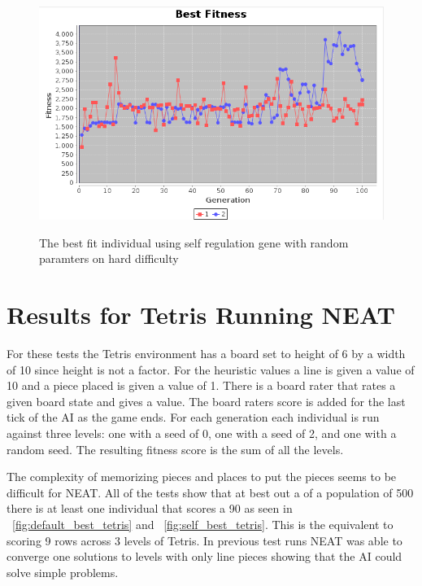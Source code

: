 \documentclass[12pt]{ucthesis} \newif\ifpdf \ifx\pdfoutput\undefined
\begin{document}
\begin{figure}[h!]
  \caption{The best fit individual using self regulation gene with random
  paramters on hard difficulty}
  \centering
    \includegraphics[width=1\textwidth]{graphsone/selfreg_random_best.png}
   \label{fig:selfreg_random_hard_best} 
\end{figure}


\section{Results for Tetris Running NEAT}
For these tests the Tetris environment has a board set to height of 6 by a width
of 10 since height is not a factor. For the heuristic values a line is given a
value of 10 and a piece placed is given a value of 1. There is a board rater
that rates a given board state and gives a value. The board raters score is
added for the last tick of the AI as the game ends. For each generation each
individual is run against three levels: one with a seed of 0, one with a seed of
2, and one with a random seed. The resulting fitness score is the sum of all the
levels.

The complexity of memorizing pieces and places to put the pieces seems to be
difficult for NEAT. All of the tests show that at best out a of a population of
500 there is at least one individual that scores a 90 as seen in
~\ref{fig:default_best_tetris} and ~\ref{fig:self_best_tetris}. This is the 
equivalent to scoring 9 rows across 3 levels of Tetris. In previous test runs
NEAT was able to converge one solutions to levels with only line pieces showing
that the AI could solve simple problems.
\end{document}
